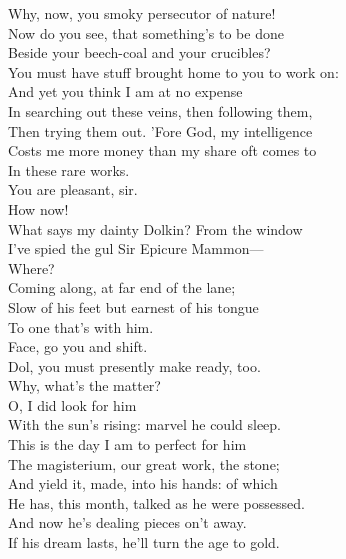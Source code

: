 \documentclass[a4paper,oneside,12pt]{memoir}
\begin{document}
\begin{drama*}
\facespeaks Why, now, you smoky persecutor of nature!\\
Now do you see, that something's to be done\\
Beside your beech-coal and your crucibles?\\
You must have stuff brought home to you to work on:\\
And yet you think I am at no expense\\
In searching out these veins, then following them,\\
Then trying them out. 'Fore God, my intelligence\\
Costs me more money than my share oft comes to\\
In these rare works.\\
\subtlespeaks {} You are pleasant, sir.\\
 How now!\\
\facespeaks What says my dainty Dolkin?
\dolspeaks {} From the window\\
I've spied the gul Sir Epicure Mammon---\\
\subtlespeaks {} Where?\\
\dolspeaks Coming along, at far end of the lane;\\
Slow of his feet but earnest of his tongue\\
To one that's with him.\\
\subtlespeaks {} Face, go you and shift.\\
Dol, you must presently make ready, too.\\
\dolspeaks Why, what's the matter?\\
\subtlespeaks {} O, I did look for him\\
With the sun's rising: marvel he could sleep.\\
This is the day I am to perfect for him\\
The magisterium, our great work, the stone;\\
And yield it, made, into his hands: of which\\
He has, this month, talked as he were possessed.\\
And now he's dealing pieces on't away.\\
If his dream lasts, he'll turn the age to gold.\\

\end{drama*}
\end{document}
